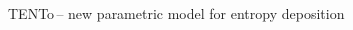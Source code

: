 \documentclass[svgnames]{beamer}
\newcommand{\trento}{T\raisebox{-.5ex}{R}ENTo}
\begin{document}
\begin{frame}{\trento \,-- new parametric model for entropy deposition}
\begin{textblock*}{0.5\linewidth}

\end{textblock*}
\end{frame}
\end{document}
